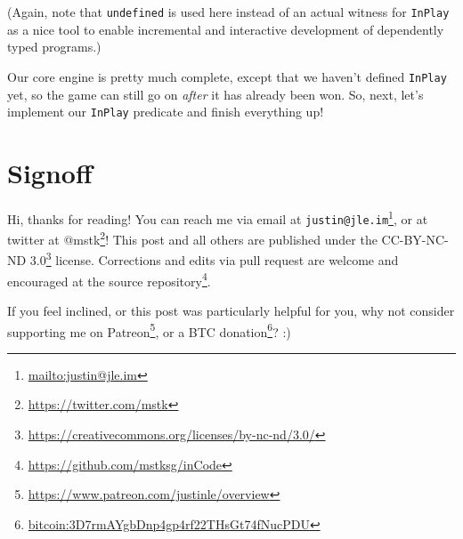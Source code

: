 \documentclass[]{article}
\renewcommand{\href}[2]{#2\footnote{\url{#1}}}
\begin{document}
(Again, note that \texttt{undefined} is used here instead of an actual witness
for \texttt{InPlay} as a nice tool to enable incremental and interactive
development of dependently typed programs.)

Our core engine is pretty much complete, except that we haven't defined
\texttt{InPlay} yet, so the game can still go on \emph{after} it has already
been won. So, next, let's implement our \texttt{InPlay} predicate and finish
everything up!

\section{Signoff}\label{signoff}

Hi, thanks for reading! You can reach me via email at
\href{mailto:justin@jle.im}{\nolinkurl{justin@jle.im}}, or at twitter at
\href{https://twitter.com/mstk}{@mstk}! This post and all others are published
under the \href{https://creativecommons.org/licenses/by-nc-nd/3.0/}{CC-BY-NC-ND
3.0} license. Corrections and edits via pull request are welcome and encouraged
at \href{https://github.com/mstksg/inCode}{the source repository}.

If you feel inclined, or this post was particularly helpful for you, why not
consider \href{https://www.patreon.com/justinle/overview}{supporting me on
Patreon}, or a \href{bitcoin:3D7rmAYgbDnp4gp4rf22THsGt74fNucPDU}{BTC donation}?
:)
\end{document}

